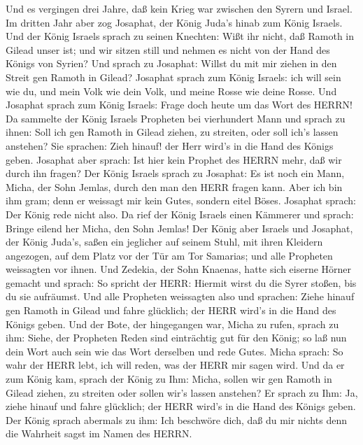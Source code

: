  Und es vergingen drei Jahre, daß kein Krieg war zwischen
den Syrern und Israel.  Im dritten Jahr aber zog Josaphat,
der König Juda's hinab zum König Israels.  Und der König
Israels sprach zu seinen Knechten: Wißt ihr nicht, daß Ramoth in Gilead
unser ist; und wir sitzen still und nehmen es nicht von der Hand des
Königs von Syrien?  Und sprach zu Josaphat: Willst du mit
mir ziehen in den Streit gen Ramoth in Gilead? Josaphat sprach zum König
Israels: ich will sein wie du, und mein Volk wie dein Volk, und meine
Rosse wie deine Rosse.  Und Josaphat sprach zum König
Israels: Frage doch heute um das Wort des HERRN!  Da
sammelte der König Israels Propheten bei vierhundert Mann und sprach zu
ihnen: Soll ich gen Ramoth in Gilead ziehen, zu streiten, oder soll
ich's lassen anstehen? Sie sprachen: Zieh hinauf! der Herr wird's in die
Hand des Königs geben.  Josaphat aber sprach: Ist hier kein
Prophet des HERRN mehr, daß wir durch ihn fragen?  Der König
Israels sprach zu Josaphat: Es ist noch ein Mann, Micha, der Sohn
Jemlas, durch den man den HERR fragen kann. Aber ich bin ihm gram; denn
er weissagt mir kein Gutes, sondern eitel Böses. Josaphat sprach: Der
König rede nicht also.  Da rief der König Israels einen
Kämmerer und sprach: Bringe eilend her Micha, den Sohn Jemlas!
 Der König aber Israels und Josaphat, der König Juda's,
saßen ein jeglicher auf seinem Stuhl, mit ihren Kleidern angezogen, auf
dem Platz vor der Tür am Tor Samarias; und alle Propheten weissagten vor
ihnen.  Und Zedekia, der Sohn Knaenas, hatte sich eiserne
Hörner gemacht und sprach: So spricht der HERR: Hiermit wirst du die
Syrer stoßen, bis du sie aufräumst.  Und alle Propheten
weissagten also und sprachen: Ziehe hinauf gen Ramoth in Gilead und
fahre glücklich; der HERR wird's in die Hand des Königs geben.
 Und der Bote, der hingegangen war, Micha zu rufen, sprach
zu ihm: Siehe, der Propheten Reden sind einträchtig gut für den König;
so laß nun dein Wort auch sein wie das Wort derselben und rede Gutes.
 Micha sprach: So wahr der HERR lebt, ich will reden, was
der HERR mir sagen wird.  Und da er zum König kam, sprach
der König zu Ihm: Micha, sollen wir gen Ramoth in Gilead ziehen, zu
streiten oder sollen wir's lassen anstehen? Er sprach zu Ihm: Ja, ziehe
hinauf und fahre glücklich; der HERR wird's in die Hand des Königs
geben.  Der König sprach abermals zu ihm: Ich beschwöre
dich, daß du mir nichts denn die Wahrheit sagst im Namen des HERRN.
